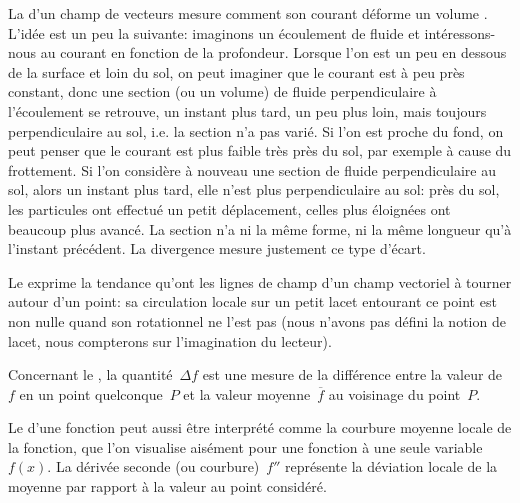 La  d'un champ de vecteurs mesure comment son courant déforme
un volume .
{\small L'idée est un peu la suivante: imaginons un écoulement de fluide et intéressons-nous au
courant en fonction de la profondeur. Lorsque l'on est un peu en dessous de la surface et loin
du sol, on peut imaginer que le courant est à peu près constant, donc une section (ou un volume)
de fluide perpendiculaire à l'écoulement se retrouve, un instant plus tard, un peu plus
loin, mais toujours perpendiculaire au sol, i.e. la section n'a pas varié.
Si l'on est proche du fond, on peut penser que le courant est plus faible très près du
sol, par exemple à cause du frottement. Si l'on considère à nouveau une section
de fluide perpendiculaire au sol, alors un instant plus tard, elle n'est plus perpendiculaire
au sol: près du sol, les particules ont effectué un petit déplacement, celles plus éloignées ont
beaucoup plus avancé. La section n'a ni la même forme, ni la même longueur
qu'à l'instant précédent. La divergence mesure justement ce type d'écart.}


Le  exprime la tendance qu'ont les lignes de champ d'un champ vectoriel
à tourner autour d'un point: sa circulation locale sur un petit lacet entourant ce point est non nulle
quand son rotationnel ne l'est pas (nous n'avons pas défini la notion de lacet, nous compterons
sur l'imagination du lecteur). 

\medskip
Concernant le , la quantité~$\Delta f$ est une mesure de la
différence entre la valeur de~$f$ en un point quelconque~$P$ et la valeur moyenne~$\overline{f}$
au voisinage du point~$P$.

Le  d'une fonction peut aussi être interprété comme la
courbure moyenne locale de la fonction, que l'on visualise aisément pour une fonction à
une seule variable~$f(x)$.
La dérivée seconde (ou courbure)~$f''$ représente la déviation locale de la moyenne par
rapport à la valeur au point considéré.


